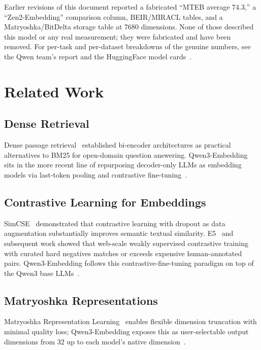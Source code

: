 \documentclass[11pt,a4paper]{article}
\begin{document}
Earlier revisions of this document reported a fabricated ``MTEB average 74.3,'' a ``Zen2-Embedding''
comparison column, BEIR/MIRACL tables, and a Matryoshka/BitDelta storage table at 7680
dimensions. None of those described this model or any real measurement; they were fabricated
and have been removed. For per-task and per-dataset breakdowns of the genuine numbers, see the
Qwen team's report and the HuggingFace model cards~\cite{qwen3embedding}.

\section{Related Work}
\label{sec:related}

\subsection{Dense Retrieval}

Dense passage retrieval~\cite{karpukhin2020dense} established bi-encoder architectures
as practical alternatives to BM25 for open-domain question answering. Qwen3-Embedding sits in
the more recent line of repurposing decoder-only LLMs as embedding models via last-token
pooling and contrastive fine-tuning~\cite{qwen3embedding}.

\subsection{Contrastive Learning for Embeddings}

SimCSE~\cite{gao2021simcse} demonstrated that contrastive learning with dropout as
data augmentation substantially improves semantic textual similarity. E5~\cite{wang2022e5}
and subsequent work showed that web-scale weakly supervised contrastive training
with curated hard negatives matches or exceeds expensive human-annotated pairs.
Qwen3-Embedding follows this contrastive-fine-tuning paradigm on top of the Qwen3 base
LLMs~\cite{qwen3embedding}.

\subsection{Matryoshka Representations}

Matryoshka Representation Learning~\cite{mrl} enables flexible dimension truncation
with minimal quality loss; Qwen3-Embedding exposes this as user-selectable output dimensions
from 32 up to each model's native dimension~\cite{qwen3embedding}.
\end{document}
